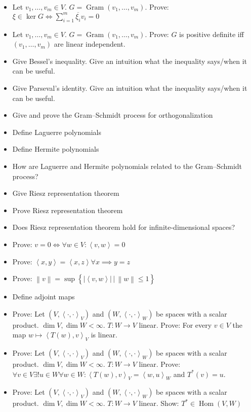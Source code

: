 \documentclass[a4paper]{article}
\newcommand{\setdef}[2]{\left\{\left.#1\,\right|\,#2\right\}}
\newcommand{\ip}[2]{\left\langle#1,#2\right\rangle} %
\newcommand{\norm}[1]{\left\|#1\right\|}
\newcommand{\card}[1]{\left|#1\right|}
\begin{document}
\begin{itemize}
  \item Let $v_1, \ldots, v_m \in V$. $G = \operatorname{Gram}(v_1, \ldots, v_m)$. Prove: $\xi \in \ker{G} \iff \sum_{i=1}^m \overline{\xi_i} v_i = 0$
  \item Let $v_1, \ldots, v_m \in V$. $G = \operatorname{Gram}(v_1, \ldots, v_m)$. Prove: $G$ is positive definite iff $(v_1, \ldots, v_m)$ are linear independent.
  \item Give Bessel's inequality. Give an intuition what the inequality says/when it can be useful.
  \item Give Parseval's identity. Give an intuition what the inequality says/when it can be useful.
  \item Give and prove the Gram--Schmidt process for orthogonalization
  \item Define Laguerre polynomials
  \item Define Hermite polynomials
  \item How are Laguerre and Hermite polynomials related to the Gram--Schmidt process?
  \item Give Riesz representation theorem
  \item Prove Riesz representation theorem
  \item Does Riesz representation theorem hold for infinite-dimensional spaces?
  \item Prove: $v = 0 \iff \forall w \in V: \ip vw = 0$
  \item Prove: $\ip xy = \ip xz \forall x \implies y = z$
  \item Prove: $\norm{v} = \sup\setdef{\card{\ip vw}}{\norm{w} \leq 1}$
  \item Define adjoint maps
  \item Prove: Let $(V, \ip{\cdot}{\cdot}_V)$ and $(W, \ip{\cdot}{\cdot}_W)$ be spaces with a scalar product. $\dim{V}, \dim{W} < \infty$.
    $T: W \to V$ linear. Prove: For every $v \in V$ the map $w \mapsto \ip{T(w)}{v}_V$ is linear.
  \item Prove: Let $(V, \ip{\cdot}{\cdot}_V)$ and $(W, \ip{\cdot}{\cdot}_W)$ be spaces with a scalar product. $\dim{V}, \dim{W} < \infty$.
    $T: W \to V$ linear. Prove: $\forall v \in V \exists! u \in W \forall w \in W: \ip{T(w)}{v}_V = \ip{w}{u}_W$ and $T^*(v) = u$.
  \item Prove: Let $(V, \ip{\cdot}{\cdot}_V)$ and $(W, \ip{\cdot}{\cdot}_W)$ be spaces with a scalar product. $\dim{V}, \dim{W} < \infty$.
    $T: W \to V$ linear. Show: $T^* \in \operatorname{Hom}(V, W)$

\end{itemize}
\end{document}
